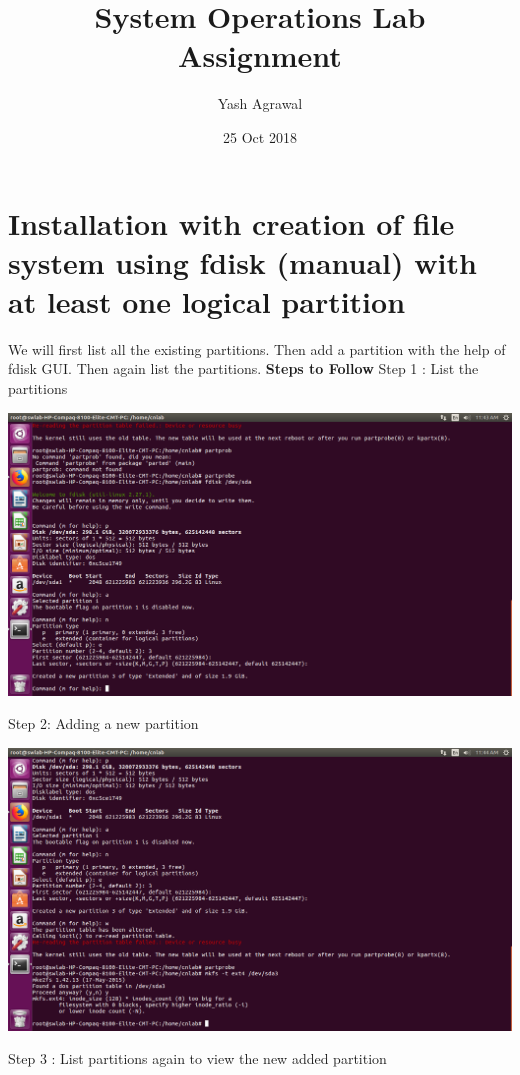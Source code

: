 \documentclass{article}
\title{System Operations Lab Assignment }
\author{Yash Agrawal}
\date{25 Oct 2018}
\begin{document}
\maketitle

\section{Installation with creation of file system using
fdisk (manual) with at least one logical partition}

We will first list all the existing partitions. Then add a partition with the help of fdisk GUI. Then again list the partitions.
\newline
\newline
\textbf{Steps to Follow} 
\newline
Step 1 : List the partitions
\newline

\begin{center}
\includegraphics[scale=0.2]{partison1.png}
\end{center}
Step 2: Adding a new partition
\newline
\begin{center}
\includegraphics[scale=0.2]{PARTISON2.png}
\end{center}
Step 3 : List partitions again to view the new added partition
\end{document}
